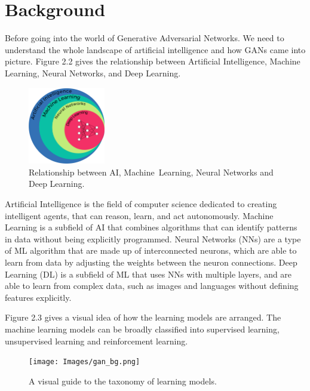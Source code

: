 \clearpage

\section{Background}

\noindent Before going into the world of Generative Adversarial Networks. We need to understand the whole landscape of artificial intelligence and how GANs came into picture. Figure 2.2 gives the relationship between Artificial Intelligence, Machine Learning, Neural Networks, and Deep Learning.

\begin{figure}
    \centering
    \includegraphics[width=0.3\textwidth]{Images/ai_ml_nn_dl.png}
    \caption[Hierarchy of Artificial Intelligence]{Relationship between AI, \mbox{Machine Learning}, Neural Networks and Deep Learning.}
\end{figure}

\noindent
Artificial Intelligence is the field of computer science dedicated to creating intelligent agents, that can reason, learn, and act autonomously. Machine Learning is a subfield of AI that combines algorithms that can identify patterns in data without being explicitly programmed. Neural Networks (NNs) are a type of ML algorithm that are made up of interconnected neurons, which are able to learn from data by adjusting the weights between the neuron connections. Deep Learning (DL) is a subfield of ML that uses NNs with multiple layers, and are able to learn from complex data, such as images and languages without defining features explicitly.

\noindent
Figure 2.3 gives a visual idea of how the learning models are arranged. The machine learning models can be broadly classified into supervised learning, unsupervised learning and reinforcement learning.

\begin{figure}[h!]
\centering
\texttt{[image: Images/gan\_bg.png]}
\caption{A visual guide to the taxonomy of learning models.}
\end{figure}

